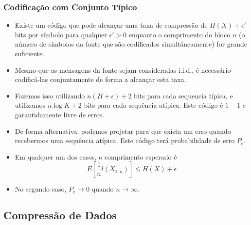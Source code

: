 \begin{frame}%
  \frametitle{Codificação com Conjunto Típico}
  \begin{itemize}
  \item Existe um código que pode alcançar uma taxa de compressão de $H(X) + \epsilon'$ bits por
        símbolo para qualquer $\epsilon' > 0$ enquanto o comprimento do bloco $n$ 
        (o número de símbolos da fonte que são codificados simultâneamente) for grande suficiente.
  \item Mesmo que as mensagens da fonte sejam consideradas i.i.d., é necessário codificá-las
        conjuntamente de forma a alcançar esta taxa.
  \item Fazemos isso utilizando $n (H + \epsilon) + 2$ bits para cada sequencia típica, e
        utilizamos $n \log K + 2$ bits para cada sequência atípica. Este código é $1-1$ e 
        garantidamente livre de erros.
  \item De forma alternativa, podemos projetar para que exista um erro quando recebermos
        uma sequência atípica. Este código terá probabilidade de erro $P_e$.
  \item Em qualquer um dos casos, o comprimento esperado é
        \begin{equation}
        E[\frac{1}{n} l(X_{1:n})] \leq H(X) + \epsilon
        \end{equation}
  \item No segundo caso, $P_e \rightarrow 0$ quando $n \rightarrow \infty$.
  \end{itemize}
\end{frame}




\subsection{Compressão de Dados}

